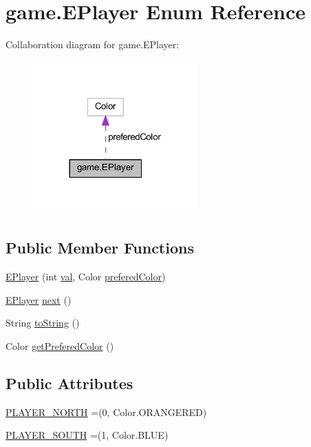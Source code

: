 \hypertarget{enumgame_1_1_e_player}{}\section{game.\+E\+Player Enum Reference}
\label{enumgame_1_1_e_player}


Collaboration diagram for game.\+E\+Player\+:
\nopagebreak
\begin{figure}[H]
\begin{center}
\leavevmode
\includegraphics[width=180pt]{enumgame_1_1_e_player__coll__graph}
\end{center}
\end{figure}
\subsection*{Public Member Functions}
\begin{DoxyCompactItemize}
\item 
\mbox{\hyperlink{enumgame_1_1_e_player_a89a038b422e068d84335cd0ef4b9aa16}{E\+Player}} (int \mbox{\hyperlink{enumgame_1_1_e_player_a10549bedd1033eba000e3e24b8a57815}{val}}, Color \mbox{\hyperlink{enumgame_1_1_e_player_a50552ddfe229efe196441d5414d7d111}{prefered\+Color}})
\item 
\mbox{\hyperlink{enumgame_1_1_e_player}{E\+Player}} \mbox{\hyperlink{enumgame_1_1_e_player_afdda1f94daa9a373b69033454063a4b3}{next}} ()
\item 
String \mbox{\hyperlink{enumgame_1_1_e_player_a74855692721e2ddd60963b62571d7e3e}{to\+String}} ()
\item 
Color \mbox{\hyperlink{enumgame_1_1_e_player_a81011e36fbbe4b17794af02d65a9dbc5}{get\+Prefered\+Color}} ()
\end{DoxyCompactItemize}
\subsection*{Public Attributes}
\begin{DoxyCompactItemize}
\item 
\mbox{\hyperlink{enumgame_1_1_e_player_ad387cb338ce70f5e4c0d6932d488363f}{P\+L\+A\+Y\+E\+R\+\_\+\+N\+O\+R\+TH}} =(0, Color.\+O\+R\+A\+N\+G\+E\+R\+ED)
\item 
\mbox{\hyperlink{enumgame_1_1_e_player_ad61f4b8b556db55e6c5947f70ae3c4de}{P\+L\+A\+Y\+E\+R\+\_\+\+S\+O\+U\+TH}} =(1, Color.\+B\+L\+UE)
\end{DoxyCompactItemize}
